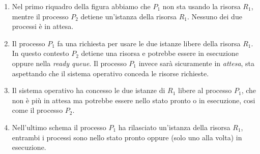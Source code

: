 \documentclass[a4paper,12pt, twoside]{report}
\begin{document}
\begin{enumerate}
\item Nel primo riquadro della figura abbiamo che $P_1$ non sta usando la risorsa $R_1$, mentre il processo $P_2$
detiene un'istanza della risorsa $R_1$. Nessuno dei due processi \`e in attesa.
\item Il processo $P_1$ fa una richiesta per usare le due istanze libere della risorsa $R_1$. In questo contesto $P_2$
detiene una risorsa e potrebbe essere in esecuzione oppure nella \emph{ready queue}. Il processo $P_1$ invece sar\`a
sicuramente in \emph{attesa}, sta aspettando che il sistema operativo conceda le risorse richieste.
\item Il sistema operativo ha concesso le due istanze di $R_1$ libere al processo $P_1$, che non \`e pi\`u in attesa ma
potrebbe essere nello stato pronto o in esecuzione, cosi come il processo $P_2$.
\item Nell'ultimo schema il processo $P_1$ ha rilasciato un'istanza della risorsa $R_1$, entrambi i processi sono nello
stato pronto oppure (solo uno alla volta) in esecuzione.
\end{enumerate}
\end{document}
